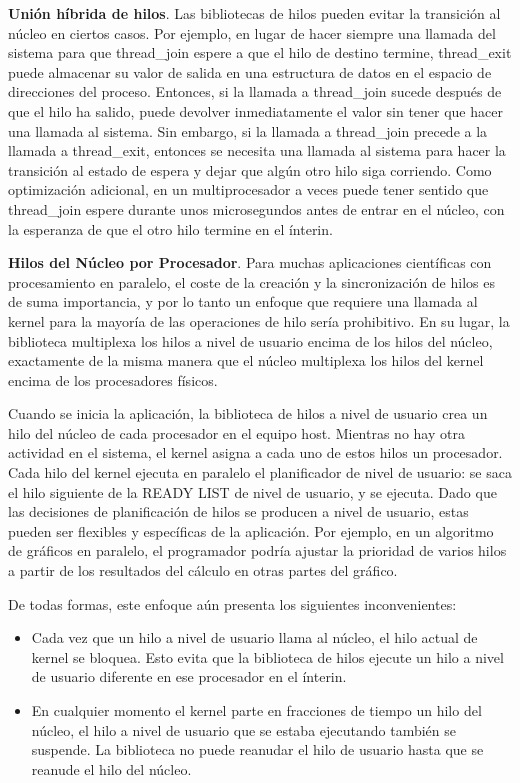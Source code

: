 \documentclass[10pt]{book}
\begin{document}
\textbf{Unión híbrida de hilos}. Las bibliotecas de hilos pueden evitar la transición al núcleo en ciertos casos. Por ejemplo, en lugar de hacer siempre una llamada del sistema para que {\mf thread\_join} espere a que el hilo de destino termine, {\mf thread\_exit} puede almacenar su valor de salida en una estructura de datos en el espacio de direcciones del proceso. Entonces, si la llamada a {\mf thread\_join} sucede después de que el hilo ha salido, puede devolver inmediatamente el valor sin tener que hacer una llamada al sistema. Sin embargo, si la llamada a {\mf thread\_join} precede a la llamada a {\mf thread\_exit}, entonces se necesita una llamada al sistema para hacer la transición al estado de espera y dejar que algún otro hilo siga corriendo. Como optimización adicional, en un multiprocesador a veces puede tener sentido que {\mf thread\_join} espere durante unos microsegundos antes de entrar en el núcleo, con la esperanza de que el otro hilo termine en el ínterin.

\textbf{Hilos del Núcleo por Procesador}. Para muchas aplicaciones científicas con procesamiento en paralelo, el coste de la creación y la sincronización de hilos es de suma importancia, y por lo tanto un enfoque que requiere una llamada al kernel para la mayoría de las operaciones de hilo sería prohibitivo. En su lugar, la biblioteca multiplexa los hilos a nivel de usuario encima de los hilos del núcleo, exactamente de la misma manera que el núcleo multiplexa los hilos del kernel encima de los procesadores físicos.

Cuando se inicia la aplicación, la biblioteca de hilos a nivel de usuario crea un hilo del núcleo de cada procesador en el equipo host. Mientras no hay otra actividad en el sistema, el kernel asigna a cada uno de estos hilos un procesador. Cada hilo del kernel ejecuta en paralelo el planificador de nivel de usuario: se saca el hilo siguiente de la READY LIST de nivel de usuario, y se ejecuta. Dado que las decisiones de planificación de hilos se producen a nivel de usuario, estas pueden ser flexibles y específicas de la aplicación. Por ejemplo, en un algoritmo de gráficos en paralelo, el programador podría ajustar la prioridad de varios hilos a partir de los resultados del cálculo en otras partes del gráfico.

De todas formas, este enfoque aún presenta los siguientes inconvenientes:
\begin{itemize}
\item Cada vez que un hilo a nivel de usuario llama al núcleo, el hilo actual de kernel se bloquea. Esto evita que la biblioteca de hilos ejecute un hilo a nivel de usuario diferente en ese procesador en el ínterin.
\item En cualquier momento el kernel parte en fracciones de tiempo un hilo del núcleo, el hilo a nivel de usuario que se estaba ejecutando también se suspende. La biblioteca no puede reanudar el hilo de usuario hasta que se reanude el hilo del núcleo.
\end{itemize}
\end{document}
